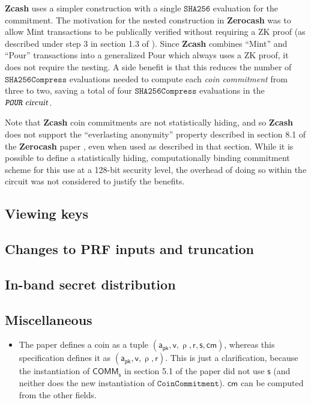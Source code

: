 \documentclass{article}
\newcommand{\todo}[1]{{\color{Sepia}\sf{TODO: #1}}}
\newcommand{\term}[1]{\textsl{#1}\xspace}
\newcommand{\termbf}[1]{\textbf{#1}\xspace}
\newcommand{\Zcash}{\termbf{Zcash}}
\newcommand{\Zerocash}{\termbf{Zerocash}}
\newcommand{\coinCommitment}{\term{coin commitment}}
\newcommand{\AuthPublic}{\mathsf{a_{pk}}}
\newcommand{\Value}{\mathsf{v}}
\newcommand{\CoinCommitRand}{\mathsf{r}}
\newcommand{\CoinAddressRand}{\mathsf{\uprho}}
\newcommand{\CoinCommitS}{\mathsf{s}}
\newcommand{\CRH}{\mathsf{CRH}}
\newcommand{\FullHash}{\mathtt{SHA256}}
\newcommand{\SHA}{\mathtt{SHA256Compress}}
\newcommand{\cm}{\mathsf{cm}}
\newcommand{\PourCircuit}{\term{\texttt{POUR} circuit}}
\newcommand{\COMM}[1]{\mathsf{COMM}_{#1}}
\newcommand{\CoinCommitment}{\mathtt{CoinCommitment}}
\begin{document}
\Zcash uses a simpler construction with a single $\FullHash$ evaluation
for the commitment. The motivation for the nested construction in \Zerocash
was to allow Mint transactions to be publically verified without requiring
a ZK proof (as described under step 3 in section 1.3 of
\cite{ZerocashOakland}). Since \Zcash combines ``Mint'' and ``Pour''
transactions into a generalized Pour which always uses a ZK proof, it
does not require the nesting. A side benefit is that this reduces the
number of $\SHA$ evaluations needed to compute each \coinCommitment from
three to two, saving a total of four $\SHA$ evaluations in the
$\PourCircuit$.

Note that \Zcash coin commitments are not statistically hiding, and
so \Zcash does not support the ``everlasting anonymity'' property
described in section 8.1 of the \Zerocash paper \cite{ZerocashOakland},
even when used as described in that section. While it is possible to
define a statistically hiding, computationally binding commitment scheme
for this use at a 128-bit security level, the overhead of doing so
within the circuit was not considered to justify the benefits.

\subsection{Viewing keys}

\todo{}

\subsection{Changes to PRF inputs and truncation}

\todo{}


\subsection{In-band secret distribution}

\todo{}

\subsection{Miscellaneous}

\begin{itemize}
    \item The paper defines a coin as a tuple $(\AuthPublic, \Value,
\CoinAddressRand, \CoinCommitRand, \CoinCommitS, \cm)$, whereas this specification
defines it as $(\AuthPublic, \Value, \CoinAddressRand, \CoinCommitRand)$.
This is just a clarification, because the instantiation of $\COMM{\CoinCommitS}$
in section 5.1 of the paper did not use $\CoinCommitS$ (and neither does the
new instantiation of $\CoinCommitment$). $\cm$ can be computed from the other
fields.
\end{itemize}
\end{document}
